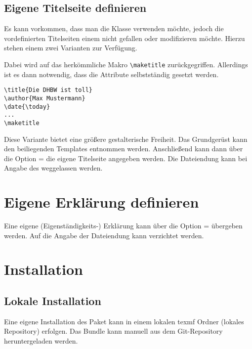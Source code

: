 \documentclass[babel=ngerman,highlight=false]{skdoc}
\begin{document}
        \subsection{Eigene Titelseite definieren}
            Es kann vorkommen, dass man die Klasse verwenden möchte, jedoch die vordefinierten Titelseiten einem nicht gefallen oder modifizieren möchte. Hierzu stehen einem zwei Varianten zur Verfügung.

            Dabei wird auf das herkömmliche Makro \verb|\maketitle| zurückgegriffen. Allerdings ist es dann notwendig, dass die Attribute selbstständig gesetzt werden.
            \begin{verbatim}
\title{Die DHBW ist toll}
\author{Max Mustermann}
\date{\today}
...
\maketitle
            \end{verbatim}

            Diese Variante bietet eine größere gestalterische Freiheit. Das Grundgerüst kann den beiliegenden Templates entnommen werden. Anschließend kann dann über die Option  =  die eigene Titelseite angegeben werden. Die Dateiendung kann bei Angabe des  weggelassen werden.

        \section{Eigene Erklärung definieren}
            Eine eigene (Eigenständigkeits-) Erklärung kann über die Option  =  übergeben werden. Auf die Angabe der Dateiendung kann verzichtet werden.


    \section{Installation}
        \subsection{Lokale Installation}
            Eine eigene Installation des Paket kann in einem lokalen texmf Ordner (lokales Repository) erfolgen. Das Bundle kann manuell aus dem Git-Repository heruntergeladen werden.
\end{document}
